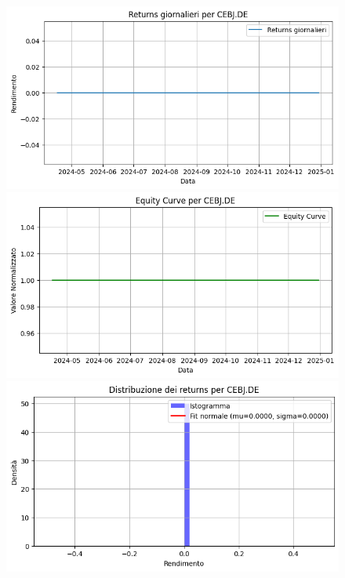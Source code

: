\documentclass{article}%
\begin{document}
\begin{figure}[htbp]%
\begin{minipage}{0.31\textwidth}%
\includegraphics[width=\linewidth]{immagini_tickers/CEBJ.DE_returns_plot.png}%
\end{minipage}%
\begin{minipage}{0.31\textwidth}%
\includegraphics[width=\linewidth]{immagini_tickers/CEBJ.DE_equity_curve.png}%
\end{minipage}%
\begin{minipage}{0.31\textwidth}%
\includegraphics[width=\linewidth]{immagini_tickers/CEBJ.DE_distribuzione_returns.png}%
\end{minipage}%
\end{figure}
\end{document}
